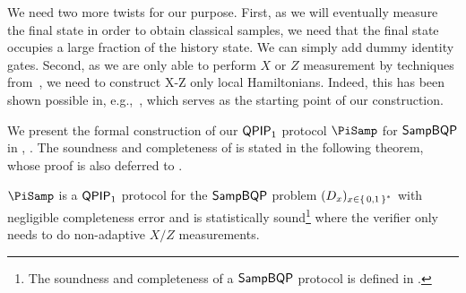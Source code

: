 We need two more twists for our purpose.
First, as we will eventually measure the final state in order to obtain classical samples, we need that the final state occupies a large fraction of the history state. We can simply add dummy identity gates.
Second, as we are only able to perform $X$ or $Z$ measurement by techniques from~\cite{FOCS:Mahadev18a},
we need to construct X-Z only local Hamiltonians.
Indeed, this has been shown possible in, e.g.,~\cite{PhysRevA.78.012352}, which serves as the starting point of our construction.


We present the formal construction of our $\operatorname{\mathsf{QPIP}}_1$ protocol $\PiSamp$ for $\operatorname{\mathsf{SampBQP}}$ in , . The soundness and completeness of  is stated in the following theorem, whose proof is also deferred to .

\begin{thm}
    \label{QPIP1thm}
	$\PiSamp$ is a $\operatorname{\mathsf{QPIP}}_1$ protocol for the $\operatorname{\mathsf{SampBQP}}$ problem  $(D_x)_{x\in\set{0,1}^*}$ with negligible completeness error and is statistically sound\footnote{The soundness and completeness of a $\operatorname{\mathsf{SampBQP}}$ protocol is defined in .} where the verifier only needs to do non-adaptive $X/Z$ measurements.
\end{thm}

\vspace{-3pt}
